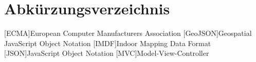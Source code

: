 \chapter*{Abkürzungsverzeichnis}

\begin{acronym}
	[ECMA]{European Computer Manufacturers Association}
	[GeoJSON]{Geospatial JavaScript Object Notation}
	[IMDF]{Indoor Mapping Data Format}
	[JSON]{JavaScript Object Notation}
	[MVC]{Model-View-Controller}
\end{acronym}

\clearpage
